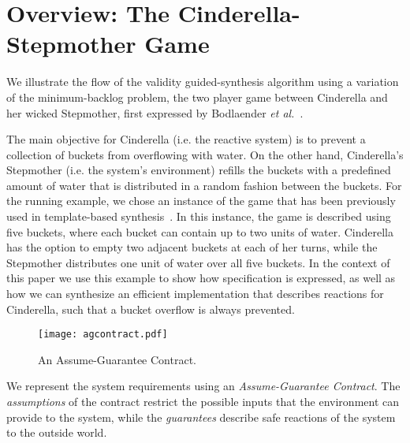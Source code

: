 \section{Overview: The Cinderella-Stepmother Game}
\label{sec:example}

We illustrate the flow of the validity guided-synthesis algorithm using a variation of the minimum-backlog
problem, the two player game between Cinderella and her wicked Stepmother, first expressed by Bodlaender \textit{et al.}~\cite{bodlaender2012cinderella}.

The main objective for Cinderella (i.e. the reactive system) is to prevent a
collection of buckets from overflowing with water. On the other hand,
Cinderella's Stepmother (i.e. the system's environment) refills the buckets with a predefined amount of water that is distributed in a random fashion between the buckets.
For the running example, we chose an instance of the game that has been
previously used in template-based synthesis~\cite{beyene2014constraint}. In this instance, the game is described
using five buckets, where each bucket can contain up to two units of water.
Cinderella has the option to empty two adjacent buckets at each of her turns,
while the Stepmother distributes one unit of water over all five buckets. In the context of this paper we use this example to show how specification is expressed, as well as how we can synthesize an efficient implementation that describes reactions for Cinderella, such that a bucket overflow is always prevented.

\begin{figure}[!t]
\centering
\texttt{[image: agcontract.pdf]}
\caption{An Assume-Guarantee Contract.}
\label{fg:agcontract}
\end{figure}

We represent the system requirements using an \textit{Assume-Guarantee
Contract}. The \emph{assumptions} of the contract restrict the possible inputs that the
environment can provide to the system, while the \emph{guarantees}
describe safe reactions of the system to the outside world.

